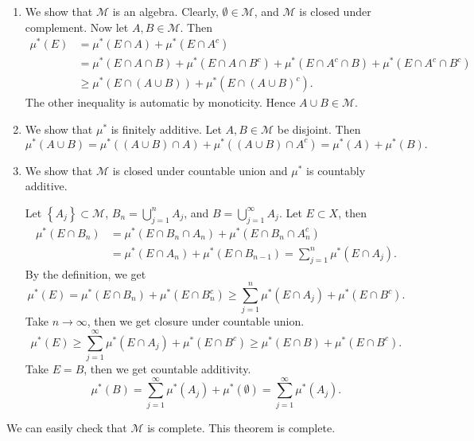 \documentclass[11pt]{article}
\theoremstyle{definition}
\newcommand{\set}[1]{\left\{ #1 \right\}}
\newcommand{\m}[1]{\mathcal{#1}}
\begin{document}
\proof
\begin{enumerate}
    \item We show that $\m{M}$ is an algebra. Clearly, $\emptyset\in\m{M}$, and $\m{M}$ is
        closed under complement. Now let $A,B\in\m{M}$. Then 
        \begin{align*}
            \mu^*(E) &= \mu^*(E\cap A) + \mu^*(E\cap A^c) \\
            &= \mu^*(E\cap A\cap B) + \mu^*(E\cap A\cap B^c) 
            + \mu^*(E\cap A^c\cap B) + \mu^*(E\cap A^c\cap B^c) \\
            &\ge \mu^*(E\cap(A\cup B)) + \mu^*(E\cap(A\cup B)^c) .
        \end{align*}
        The other inequality is automatic by monoticity. Hence $A\cup B \in \m{M}$. 

    \item We show that $\mu^*$ is finitely additive. Let $A,B\in\m{M}$ be disjoint. Then
        \[
            \mu^*(A\cup B) = \mu^*((A\cup B)\cap A) + \mu^*((A\cup B)\cap A^c)
            = \mu^*(A) + \mu^*(B) .
        \]

    \item We show that $\m{M}$ is closed under countable union and $\mu^*$ is countably
        additive.

        Let $\set{A_j} \subset \m{M}$, $B_n = \bigcup_{j=1}^n A_j$, and $B =
        \bigcup_{j=1}^\infty A_j$. Let $E\subset X$, then 
        \begin{align*}
            \mu^*(E\cap B_n) &= \mu^*(E\cap B_n\cap A_n) + \mu^*(E\cap B_n\cap A_n^c) \\
            &= \mu^*(E\cap A_n) + \mu^*(E\cap B_{n-1}) = \sum_{j=1}^n \mu^*(E\cap A_j) .
        \end{align*}
        By the definition, we get 
        \[
            \mu^*(E) = \mu^*(E\cap B_n) + \mu^*(E\cap B_n^c)
            \ge \sum_{j=1}^n\mu^*(E\cap A_j) + \mu^*(E\cap B^c) .
        \]
        Take $n\to\infty$, then we get closure under countable union.
        \[
            \mu^*(E)\ge\sum_{j=1}^\infty\mu^*(E\cap A_j) + \mu^*(E\cap B^c)
            \ge \mu^*(E\cap B) + \mu^*(E\cap B^c) .
        \]
        Take $E=B$, then we get countable additivity.
        \[
            \mu^*(B) = \sum_{j=1}^\infty \mu^*(A_j) + \mu^*(\emptyset)
            = \sum_{j=1}^\infty \mu^*(A_j) .
        \]
\end{enumerate}
We can easily check that $\m{M}$ is complete. This theorem is complete.
\qedhere


\end{document}
